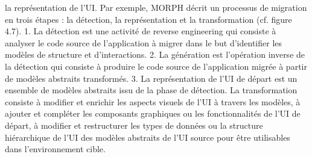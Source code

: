 \documentclass{article}
\begin{document}
la représentation de l’UI. Par exemple, MORPH décrit un processus de migration en trois étapes : la
détection, la représentation et la transformation (cf. ﬁgure 4.7).
1. La détection est une activité de reverse engineering qui consiste à analyser le code source de
l’application à migrer dans le but d’identiﬁer les modèles de structure et d’interactions.
2. La génération est l’opération inverse de la détection qui consiste à produire le code source de
l’application migrée à partir de modèles abstraits transformés.
3. La représentation de l’UI de départ est un ensemble de modèles abstraits issu de la phase de
détection. La transformation consiste à modiﬁer et enrichir les aspects visuels de l’UI à travers
les modèles, à ajouter et compléter les composants graphiques ou les fonctionnalités de l’UI de
départ, à modiﬁer et restructurer les types de données ou la structure hiérarchique de l’UI des
modèles abstraits de l’UI source pour être utilisables dans l’environnement cible.
 
\end{document}
